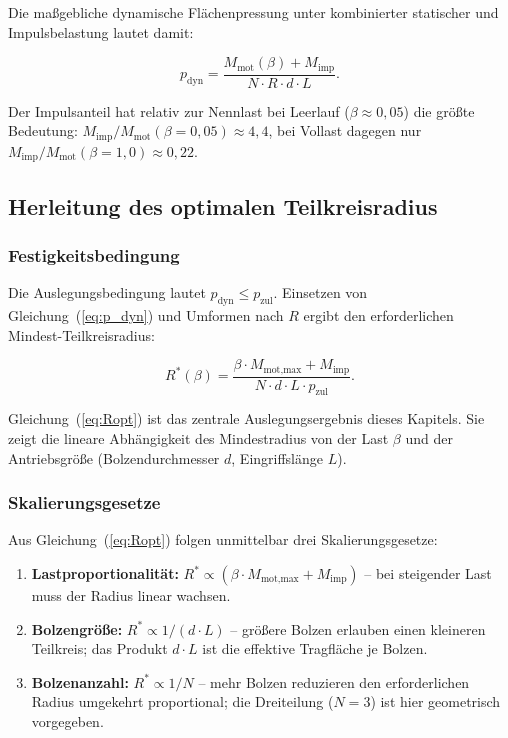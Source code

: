 ﻿\documentclass[a4paper,12pt]{article}
\begin{document}
Die maßgebliche dynamische Flächenpressung unter kombinierter statischer
und Impulsbelastung lautet damit:

\begin{equation}
  p_\text{dyn} = \frac{M_\text{mot}(\beta) + M_\text{imp}}{N \cdot R \cdot d \cdot L}.
  \label{eq:p_dyn}
\end{equation}

Der Impulsanteil hat relativ zur Nennlast bei Leerlauf ($\beta \approx 0{,}05$)
die größte Bedeutung: $M_\text{imp} / M_\text{mot}(\beta{=}0{,}05) \approx 4{,}4$,
bei Vollast dagegen nur $M_\text{imp}/M_\text{mot}(\beta{=}1{,}0) \approx 0{,}22$.

\subsection{Herleitung des optimalen Teilkreisradius}

\subsubsection*{Festigkeitsbedingung}

Die Auslegungsbedingung lautet $p_\text{dyn} \leq p_\text{zul}$.
Einsetzen von Gleichung~(\ref{eq:p_dyn}) und Umformen nach $R$ ergibt
den erforderlichen Mindest-Teilkreisradius:

\begin{equation}
  \boxed{
  R^*(\beta) = \frac{\beta \cdot M_\text{mot,max} + M_\text{imp}}
    {N \cdot d \cdot L \cdot p_\text{zul}}.
  }
  \label{eq:Ropt}
\end{equation}

Gleichung~(\ref{eq:Ropt}) ist das zentrale Auslegungsergebnis dieses Kapitels.
Sie zeigt die lineare Abhängigkeit des Mindestradius von der Last $\beta$ und
der Antriebsgröße (Bolzendurchmesser $d$, Eingriffslänge $L$).

\subsubsection*{Skalierungsgesetze}

Aus Gleichung~(\ref{eq:Ropt}) folgen unmittelbar drei Skalierungsgesetze:

\begin{enumerate}
  \item \textbf{Lastproportionalität:} $R^* \propto (\beta \cdot M_\text{mot,max} + M_\text{imp})$
    -- bei steigender Last muss der Radius linear wachsen.
  \item \textbf{Bolzengröße:} $R^* \propto 1/(d \cdot L)$ -- größere Bolzen
    erlauben einen kleineren Teilkreis; das Produkt $d \cdot L$ ist die
    effektive Tragfläche je Bolzen.
  \item \textbf{Bolzenanzahl:} $R^* \propto 1/N$ -- mehr Bolzen reduzieren den
    erforderlichen Radius umgekehrt proportional; die Dreiteilung ($N=3$)
    ist hier geometrisch vorgegeben.
\end{enumerate}
\end{document}
